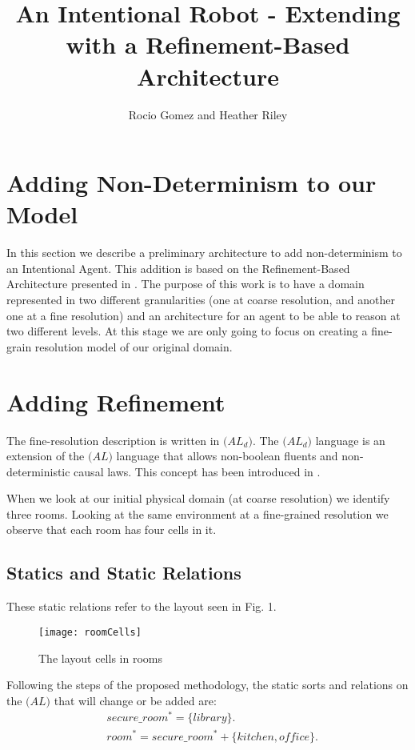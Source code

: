 \documentclass[11pt, oneside]{article}
\title{An Intentional Robot - Extending with a Refinement-Based Architecture}
\author{Rocio Gomez and Heather Riley}
\begin{document}
\maketitle


\section{Adding Non-Determinism to our Model}
In this section we describe a preliminary architecture to add non-determinism to an Intentional Agent. This addition is based on the Refinement-Based Architecture presented in \cite{sridharan2017refinement}. The purpose of this work is to have a domain represented in two different granularities (one at coarse resolution, and another one at a fine resolution) and an architecture for an agent to be able to reason at two different levels. At this stage we are only going to focus on creating a fine-grain resolution model of our original domain. 


\section{Adding Refinement}
The fine-resolution description is written in $\mathcal(AL_d)$.  The $\mathcal(AL_d)$ language is an extension of the $\mathcal(AL)$ language that allows non-boolean fluents and non-deterministic causal laws. This concept has been introduced in \cite{sridharan2017refinement}.

When we look at our initial physical domain (at coarse resolution) we identify three rooms. Looking at the same environment at a fine-grained resolution we observe that each room has four cells in it. 

\subsection{Statics and Static Relations}

These static relations refer to the layout seen in Fig. 1.
\begin{figure}[t]
\centering
\texttt{[image: roomCells]}\par
\caption{The layout cells in rooms}
\end{figure}

Following the steps of the proposed methodology, the static sorts and relations on the $\mathcal(AL)$ that will change or be added are:
 \begin{align*}
  &secure\_room^* = \{library\}.\\
  &room^* = secure\_room^* +\{kitchen, office\}.
\end{align*}
\end{document}
